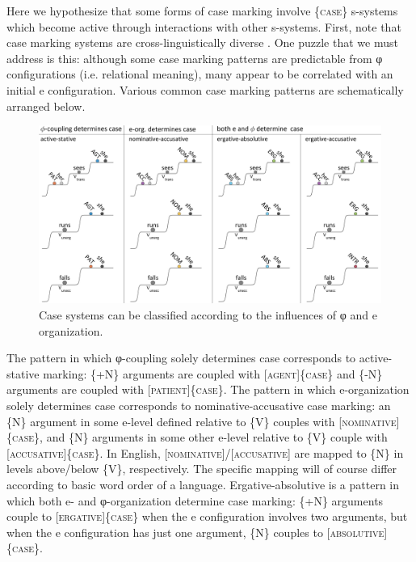   Here we hypothesize that some forms of case marking involve \{\textsc{case}\} s-systems which become active through interactions with other s-systems. First, note that case marking systems are cross-linguistically diverse \citep{MalchukovSpencer2008}. One puzzle that we must address is this: although some case marking patterns are predictable from φ configurations (i.e. relational meaning), many appear to be correlated with an initial e configuration. Various common case marking patterns are schematically arranged below. 

  
\begin{figure}
\includegraphics[width=\textwidth]{figures/Tilsen-img70.png}
\caption{Case systems can be classified according to the influences of φ and e organization.}
\label{fig:4:20}
\end{figure}
 

  The pattern in which φ-coupling solely determines case corresponds to active-stative marking: \{+N\} arguments are coupled with [\textsc{agent}]\{\textsc{case}\} and \{-N\} arguments are coupled with [\textsc{patient}]\{\textsc{case}\}. The pattern in which e-organization solely determines case corresponds to nominative-accusative case marking: an \{N\} argument in some e-level defined relative to \{V\} couples with [\textsc{nominative}]\{\textsc{case}\}, and \{N\} arguments in some other e-level relative to \{V\} couple with [\textsc{accusative}]\{\textsc{case\}}. In English, [\textsc{nominative}]/[\textsc{accusative}] are mapped to \{N\} in levels above/below \{V\}, respectively. The specific mapping will of course differ according to basic word order of a language. Ergative-absolutive is a pattern in which both e- and φ-organization determine case marking: \{+N\} arguments couple to [\textsc{ergative}]\{\textsc{case}\} when the e configuration involves two arguments, but when the e configuration has just one argument, \{N\} couples to [\textsc{absolutive}]\{\textsc{case}\}.

